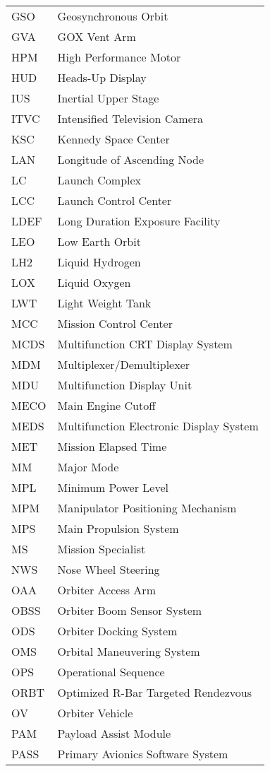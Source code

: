 \documentclass[Space_Shuttle_Vessel_Manual.tex]{subfiles}
\begin{document}
\begin{longtable}{l l }
GSO & Geosynchronous Orbit\\
GVA & GOX Vent Arm\\
HPM & High Performance Motor\\
HUD & Heads-Up Display\\
IUS & Inertial Upper Stage\\
ITVC & Intensified Television Camera\\
KSC & Kennedy Space Center\\
LAN & Longitude of Ascending Node\\
LC & Launch Complex\\
LCC & Launch Control Center\\
LDEF & Long Duration Exposure Facility\\
LEO & Low Earth Orbit\\
LH2 & Liquid Hydrogen\\
LOX & Liquid Oxygen\\
LWT & Light Weight Tank\\
MCC & Mission Control Center\\
MCDS & Multifunction CRT Display System\\
MDM & Multiplexer/Demultiplexer\\
MDU & Multifunction Display Unit\\
MECO & Main Engine Cutoff\\
MEDS & Multifunction Electronic Display System\\
MET & Mission Elapsed Time\\
MM & Major Mode\\
MPL & Minimum Power Level\\
MPM & Manipulator Positioning Mechanism\\
MPS & Main Propulsion System\\
MS & Mission Specialist\\
NWS & Nose Wheel Steering\\
OAA & Orbiter Access Arm\\
OBSS & Orbiter Boom Sensor System\\
ODS & Orbiter Docking System\\
OMS & Orbital Maneuvering System\\
OPS & Operational Sequence\\
ORBT & Optimized R-Bar Targeted Rendezvous\\
OV & Orbiter Vehicle\\
PAM & Payload Assist Module\\
PASS & Primary Avionics Software System\\

\end{longtable}
\end{document}
